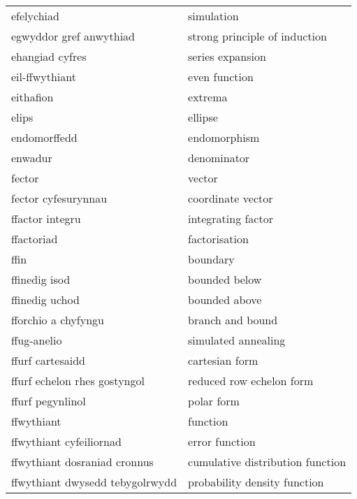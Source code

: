 \begin{supertabular}{p{0.22\textwidth}p{0.22\textwidth}}
                      efelychiad &                        simulation \\
         egwyddor gref anwythiad &     strong principle of induction \\
                 ehangiad cyfres &                  series expansion \\
                  eil-ffwythiant &                     even function \\
                       eithafion &                           extrema \\
                           elips &                           ellipse \\
                    endomorffedd &                      endomorphism \\
                         enwadur &                       denominator \\
                          fector &                            vector \\
             fector cyfesurynnau &                 coordinate vector \\
                 ffactor integru &                integrating factor \\
                      ffactoriad &                     factorisation \\
                            ffin &                          boundary \\
                   ffinedig isod &                     bounded below \\
                  ffinedig uchod &                     bounded above \\
             fforchio a chyfyngu &                  branch and bound \\
                     ffug-anelio &               simulated annealing \\
                ffurf cartesaidd &                    cartesian form \\
    ffurf echelon rhes gostyngol &          reduced row echelon form \\
                ffurf pegynlinol &                        polar form \\
                      ffwythiant &                          function \\
         ffwythiant cyfeiliornad &                    error function \\
    ffwythiant dosraniad cronnus &  cumulative distribution function \\
 ffwythiant dwysedd tebygolrwydd &      probability density function \\

\end{supertabular}
